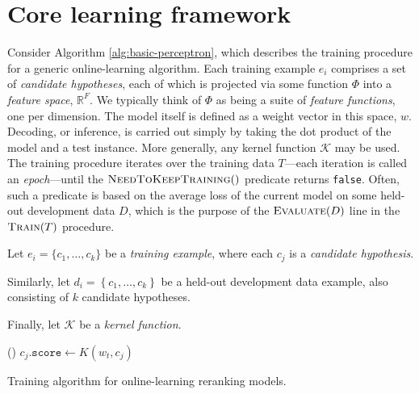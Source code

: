 \documentclass[a4paper]{article}
\begin{document}
\section{Core learning framework}

Consider Algorithm \ref{alg:basic-perceptron}, which describes the
training procedure for a generic online-learning algorithm. Each
training example $e_{i}$ comprises a set of \emph{candidate hypotheses},
each of which is projected via some function $\Phi$ into a \emph{feature
space}, $\mathbb{R}^{F}$. We typically think of $\Phi$ as being
a suite of \emph{feature functions}, one per dimension.\emph{ }The\emph{
}model itself is defined as a weight vector in this space, $w$. Decoding,
or inference, is carried out simply by taking the dot product of the
model and a test instance. More generally, any kernel function $\mathcal{K}$
may be used. The training procedure iterates over the training data
$T$---each iteration is called an \emph{epoch}---until the $\Call{NeedToKeepTraining}{}()$
predicate returns \texttt{false}. Often, such a predicate is based
on the average loss of the current model on some held-out development
data $D$, which is the purpose of the $\Call{Evaluate}{D}$ line
in the $\Call{Train}{T}$ procedure.

\begin{algorithm}
\scriptsize
Let $e_{i}=\{c_{1},\ldots,c_{k}\}$ be a \emph{training example},
where each $c_{j}$ is a \emph{candidate hypothesis}.

Similarly, let $d_{i}=\left\{ c_{1},\ldots,c_{k}\right\} $ be a held-out
development data example, also consisting of $k$ candidate hypotheses.

Finally, let $\mathcal{K}$ be a \emph{kernel function}.

\renewcommand\algorithmicforall{\textbf{foreach}}
\begin{algorithmic}
\scriptsize
{}
    \State {}
    \State {}
  \EndWhile
\EndProcedure
\State
{}
    \State {}
      \State {}()
    \EndIf
  \EndFor
\EndProcedure
\State
{}
    \State $c_j.\texttt{score} \leftarrow K(w_t, c_j)$
  \EndFor
\EndProcedure
\normalsize
\end{algorithmic}

\caption{\label{alg:basic-perceptron}Training algorithm for online-learning
reranking models.}
\end{algorithm}
\end{document}
